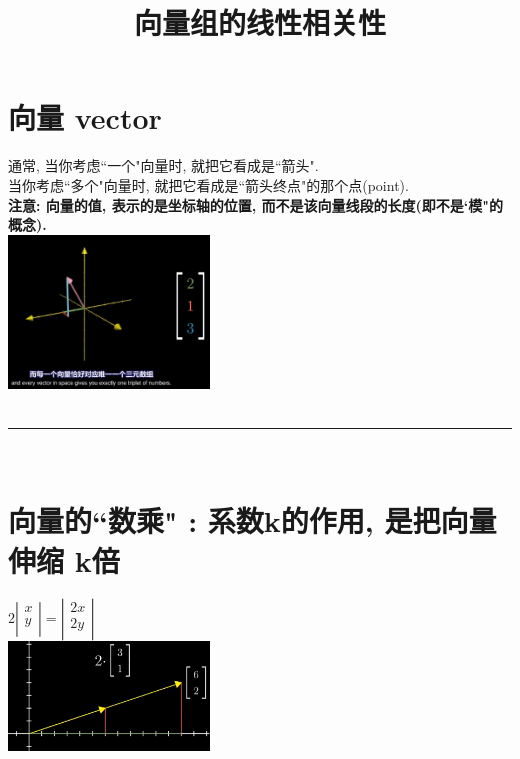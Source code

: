 \documentclass[UTF8]{ctexart}
\title{向量组的线性相关性}
\begin{document}
	\tableofcontents %
	\date{} %
	\maketitle  %
	
	\section{向量 vector}
	
	通常, 当你考虑``一个"向量时, 就把它看成是``箭头". \\
	当你考虑``多个"向量时, 就把它看成是``箭头终点"的那个点(point).\\
	
	\textbf{注意: 向量的值, 表示的是坐标轴的位置, 而不是该向量线段的长度(即不是`模"的概念).}\\
	
	\includegraphics[width=0.4\textwidth]{img/0066.png}\\
	
	
	~\\
	\hrule
	~\\
	
	\section{向量的``数乘" : 系数k的作用, 是把向量伸缩 k倍}
	
	$2\left| \begin{array}{l}
		x\\
		y\\
	\end{array} \right|=\left| \begin{array}{l}
		2x\\
		2y\\
	\end{array} \right|
	$\\
	
	\includegraphics[width=0.4\textwidth]{img/0067.png}\\	
	
\end{document}
